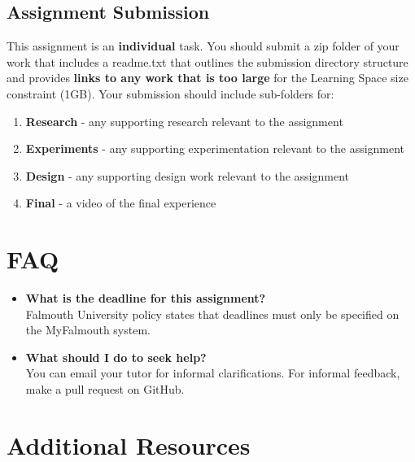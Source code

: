 \documentclass{../../fal_assignment}
\begin{document}
\subsection*{Assignment Submission}
This assignment is an \textbf{individual} task. You should submit a zip folder of your work that includes a readme.txt  that outlines the submission directory structure and provides \textbf{links to any work that is too large} for the Learning Space size constraint (1GB). Your submission should include sub-folders for:
\begin{enumerate}[label=\roman*.]
    	\item \textbf{Research} - any supporting research relevant to the assignment
    	\item \textbf{Experiments} - any supporting experimentation relevant to the assignment
    	\item \textbf{Design} - any supporting design work relevant to the assignment
    	\item \textbf{Final} - a video of the final experience
\end{enumerate}

\section*{FAQ}

\begin{itemize}
	\item 	\textbf{What is the deadline for this assignment?} \\ 
    		Falmouth University policy states that deadlines must only be specified on the MyFalmouth system.
    		
	\item 	\textbf{What should I do to seek help?} \\ 
    		You can email your tutor for informal clarifications. For informal feedback, make a pull request on GitHub. 
    		
\end{itemize}

\section*{Additional Resources}

\end{document}
